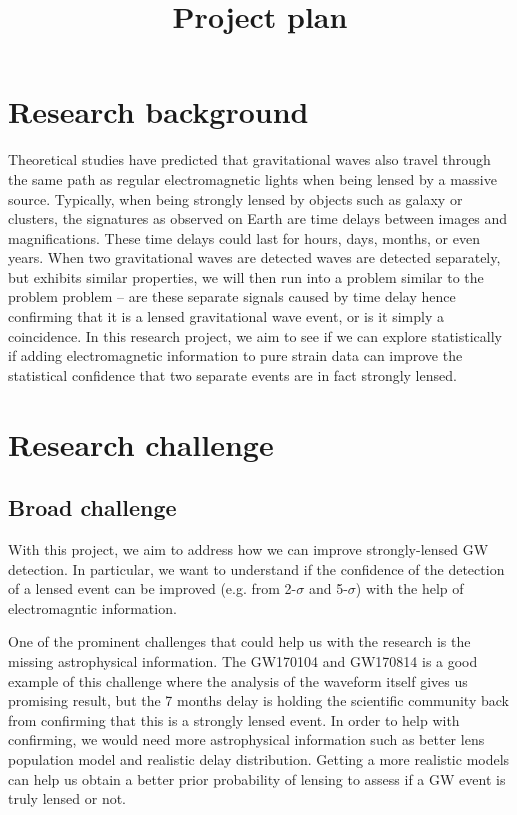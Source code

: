\documentclass[pdflatex,sn-mathphys-num]{sn-jnl}%
\theoremstyle{thmstyleone}%
\theoremstyle{thmstyletwo}%
\theoremstyle{thmstylethree}%
\begin{document}
\title[Article Title]{Project plan}

\author{ }

\maketitle


\section{Research background}

Theoretical studies have predicted that gravitational waves also travel through the same path as regular electromagnetic lights when being lensed by a massive source. Typically, when being strongly lensed by objects such as galaxy or clusters, the signatures as observed on Earth are time delays between images and magnifications. These time delays could last for hours, days, months, or even years. When two gravitational waves are detected waves are detected separately, but exhibits similar properties, we will then run into a problem similar to the problem problem -- are these separate signals caused by time delay hence confirming that it is a lensed gravitational wave event, or is it simply a coincidence. In this research project, we aim to see if we can explore statistically if adding electromagnetic information to pure strain data can improve the statistical confidence that two separate events are in fact strongly lensed. 

\section{Research challenge}

\subsection{Broad challenge}

With this project, we aim to address how we can improve strongly-lensed GW detection. In particular, we want to understand if the confidence of the detection of a lensed event can be improved (e.g. from 2-$\sigma$ and 5-$\sigma$) with the help of electromagntic information.

One of the prominent challenges that could help us with the research is the missing astrophysical information. The GW170104 and GW170814 is a good example of this challenge where the analysis of the waveform itself gives us promising result, but the 7 months delay is holding the scientific community back from confirming that this is a strongly lensed event. In order to help with confirming, we would need more astrophysical information such as better lens population model and realistic delay distribution. Getting a more realistic models can help us obtain a better prior probability of lensing to assess if a GW event is truly lensed or not.
\end{document}
